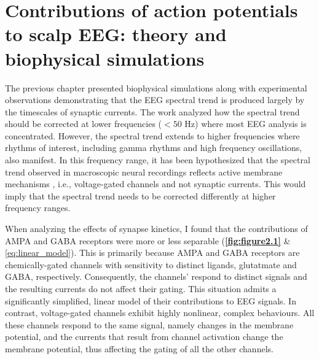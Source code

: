 \chapter{Contributions of action potentials to scalp EEG: theory and biophysical simulations}
\label{sec:apEEG}
\renewcommand{\figurename}{Fig}

The previous chapter presented biophysical simulations along with experimental observations demonstrating that the EEG spectral trend is produced largely by the timescales of synaptic currents. The work analyzed how the spectral trend should be corrected at lower frequencies ($<50$ \unit{\hertz}) where most EEG analysis is concentrated. However, the spectral trend extends to higher frequencies where rhythms of interest, including gamma rhythms and high frequency oscillations, also manifest. In this frequency range, it has been hypothesized that the spectral trend observed in macroscopic neural recordings reflects active membrane mechanisms \cite{Gao2016}, i.e., voltage-gated channels and not synaptic currents. This would imply that the spectral trend needs to be corrected differently at higher frequency ranges. 

When analyzing the effects of synapse kinetics, I found that the contributions of AMPA and GABA receptors were more or less separable (\textbf{\autoref{fig:figure2.1}} \& \ref{eq:linear_model}). This is primarily because AMPA and GABA receptors are chemically-gated channels with sensitivity to distinct ligands, glutatmate and GABA, respectively. Consequently, the channels' respond to distinct signals and the resulting currents do not affect their gating. This situation admits a significantly simplified, linear model of their contributions to EEG signals. In contrast, voltage-gated channels exhibit highly nonlinear, complex behaviours. All these channels respond to the same signal, namely changes in the membrane potential, and the currents that result from channel activation change the membrane potential, thus affecting the gating of all the other channels.

